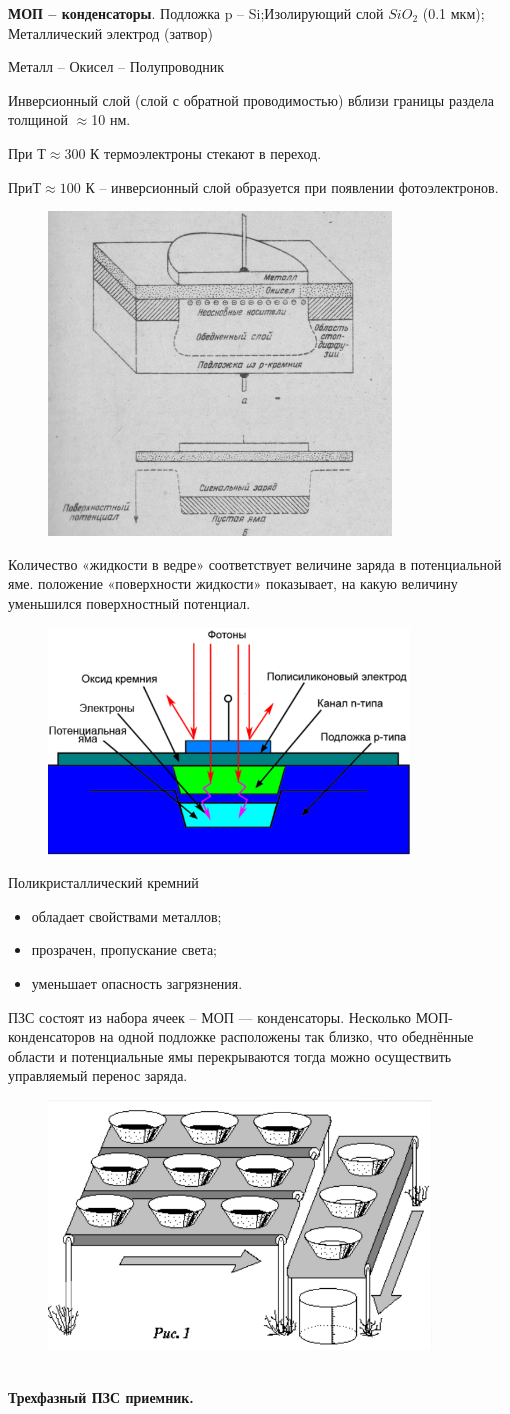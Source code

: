 \documentclass[12pt]{article}
\begin{document}
\textbf{МОП – конденсаторы}.
Подложка p – Si;Изолирующий слой $SiO_2$
(0.1 мкм); Металлический электрод
(затвор)

Металл – Окисел – Полупроводник

Инверсионный слой (слой с
обратной проводимостью)
вблизи границы раздела
толщиной $\approx$10 нм.

При $Т \approx 300$ К
термоэлектроны стекают в
переход.

При$Т \approx 10$0 К – инверсионный
слой образуется при появлении
фотоэлектронов.
\begin{figure}[h]
	\centering
	\includegraphics[width=0.3\linewidth]{"Снимок экрана от 2024-12-23 19-44-10"}
\end{figure}
Количество «жидкости в ведре»
соответствует величине заряда в
потенциальной яме. положение «поверхности жидкости»
показывает, на какую величину
уменьшился поверхностный
потенциал.

\begin{figure}[h]
	\centering
	\includegraphics[width=0.5\linewidth]{"Снимок экрана от 2024-12-23 19-45-06"}
\end{figure}
Поликристаллический кремний
\begin{itemize}
	\item обладает свойствами
	металлов;
	\item прозрачен, пропускание света;
	\item уменьшает опасность
	загрязнения.
\end{itemize}

ПЗС состоят из набора ячеек – МОП — конденсаторы.
Несколько МОП-конденсаторов на
одной подложке расположены так
близко, что обеднённые области
и потенциальные ямы перекрываются
тогда можно осуществить
управляемый перенос заряда.
\begin{figure}[h]
	\centering
	\includegraphics[width=0.4\linewidth]{"Снимок экрана от 2024-12-23 19-46-43"}
\end{figure}\\
\textbf{Трехфазный ПЗС приемник.}
\end{document}

